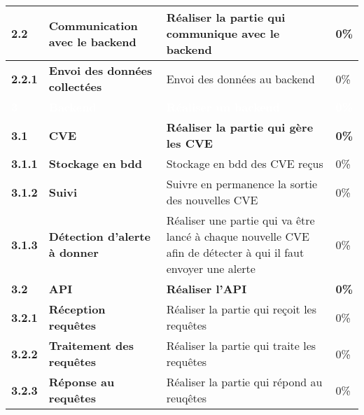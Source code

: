 \begin{supertabular}{|p{1.5cm} p{6cm}|p{5cm}|R{2cm}|}
  \textbf{2.2}  & \textbf{Communication avec le backend} & \textbf{Réaliser la partie qui communique avec le backend} & \textbf{0\%} \\
  \hline

  \hspace{6pt}
  \textbf{2.2.1}  & \textbf{Envoi des données collectées} & Envoi des données au backend & 0\% \\
  \hline


  \textcolor{white}{\textbf{3}}  & \textcolor{white}{\textbf{Backend}} & \textcolor{white}{\textbf{Réaliser un backend}} & \textcolor{white}{\textbf{0\%}} \\
  \hline

  \textbf{3.1}  & \textbf{CVE} & \textbf{Réaliser la partie qui gère les CVE} & \textbf{0\%} \\
  \hline

  \hspace{6pt}
  \textbf{3.1.1}  & \textbf{Stockage en bdd} & Stockage en bdd des CVE reçus & 0\% \\
  \hline

  \hspace{6pt}
  \textbf{3.1.2}  & \textbf{Suivi} & Suivre en permanence la sortie des nouvelles CVE  & 0\% \\
  \hline

  \hspace{6pt}
  \textbf{3.1.3}  & \textbf{Détection d'alerte à donner} & Réaliser une partie qui va être lancé à chaque nouvelle CVE afin de détecter à qui il faut envoyer une alerte & 0\% \\
  \hline


  \textbf{3.2}  & \textbf{API} & \textbf{Réaliser l'API} & \textbf{0\%} \\
  \hline

  \hspace{6pt}
  \textbf{3.2.1}  & \textbf{Réception requêtes} & Réaliser la partie qui reçoit les requêtes & 0\% \\
  \hline

  \hspace{6pt}
  \textbf{3.2.2}  & \textbf{Traitement des requêtes} & Réaliser la partie qui traite les requêtes  & 0\% \\
  \hline

  \hspace{6pt}
  \textbf{3.2.3}  & \textbf{Réponse au requêtes} & Réaliser la partie qui répond au reuqêtes & 0\% \\
  \hline



\end{supertabular}
